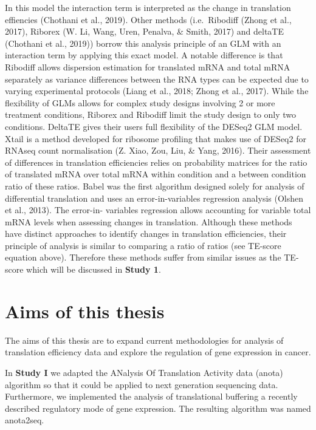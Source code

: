 \documentclass[
  12pt,
  openany]{book}
\begin{document}
In this model the interaction term is interpreted as the change in translation effiencies (Chothani et al., 2019). Other methods (i.e.~Ribodiff (Zhong et al., 2017), Riborex (W. Li, Wang, Uren, Penalva, \& Smith, 2017) and deltaTE (Chothani et al., 2019)) borrow this analysis principle of an GLM with an interaction term by applying this exact model. A notable difference is that Ribodiff allows dispersion estimation for translated mRNA and total mRNA separately as variance differences between the RNA types can be expected due to varying experimental protocols (Liang et al., 2018; Zhong et al., 2017). While the flexibility of GLMs allows for complex study designs involving 2 or more treatment conditions, Riborex and Ribodiff limit the study design to only two conditions. DeltaTE gives their users full flexibility of the DESeq2 GLM model. Xtail is a method developed for ribosome profiling that makes use of DESeq2 for RNAseq count normalisation (Z. Xiao, Zou, Liu, \& Yang, 2016). Their assessment of differences in translation efficiencies relies on probability matrices for the ratio of translated mRNA over total mRNA within condition and a between condition ratio of these ratios. Babel was the first algorithm designed solely for analysis of differential translation and uses an error-in-variables regression analysis (Olshen et al., 2013). The error-in- variables regression allows accounting for variable total mRNA levels when assessing changes in translation. Although these methods have distinct approaches to identify changes in translation efficiencies, their principle of analysis is similar to comparing a ratio of ratios (see TE-score equation above). Therefore these methods suffer from similar issues as the TE-score which will be discussed in \textbf{Study 1}.

\chapter{Aims of this thesis}

The aims of this thesis are to expand current methodologies for analysis of translation efficiency data and explore the regulation of gene expression in cancer.

In \textbf{Study I} we adapted the ANalysis Of Translation Activity data (anota) algorithm so that it could be applied to next generation sequencing data. Furthermore, we implemented the analysis of translational buffering a recently described regulatory mode of gene expression. The resulting algorithm was named anota2seq.
\end{document}
